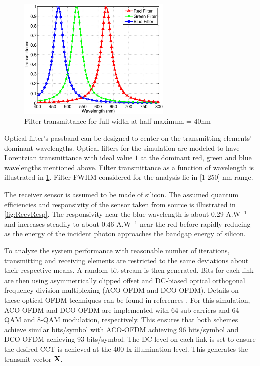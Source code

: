\begin{figure}[!t]
	\centering
		\includegraphics[trim={0.15in 0.05in 0.05in 0.35in}, clip=true, width=2.9in]{img/FiltTr.eps}
	\caption{Filter transmittance for full width at half maximum = 40nm}
	\label{fig:FiltTr}
\end{figure}

Optical filter's passband can be designed to center on the transmitting elements' dominant wavelengths. Optical filters for the simulation are modeled to have Lorentzian transmittance with ideal value $1$ at the dominant red, green and blue wavelengths mentioned above. Filter transmittance as a function of wavelength is illustrated in \figurename{\ref{fig:FiltTr}}. Filter FWHM considered for the analysis lie in [1 250] nm range.

The receiver sensor is assumed to be made of silicon. The assumed quantum efficiencies and responsivity of the sensor taken from source \cite{qeff} is illustrated in \figurename{\ref{fig:RecvResp}}. The responsivity near the blue wavelength is about 0.29 A.W$^{-1}$ and increases steadily to about 0.46 A.W$^{-1}$ near the red before rapidly reducing as the energy of the incident photon approaches the bandgap energy of silicon.

To analyze the system performance with reasonable number of iterations, transmitting and receiving elements are restricted to the same deviations about their respective means. A random bit stream is then generated. Bits for each link are then using asymmetrically clipped offset and DC-biased optical orthogonal frequency division multiplexing (ACO-OFDM and DCO-OFDM). Details on these optical OFDM techniques can be found in references \cite{car96a,arm06a}. For this simulation, ACO-OFDM and DCO-OFDM are implemented with 64 sub-carriers and 64-QAM and 8-QAM modulation, respectively. This ensures that both schemes achieve similar bits/symbol with ACO-OFDM achieving 96 bits/symbol and DCO-OFDM achieving 93 bits/symbol. The DC level on each link is set to ensure the desired CCT is achieved at the 400 lx illumination level. This generates the transmit vector ${\bf{X}}$. 

